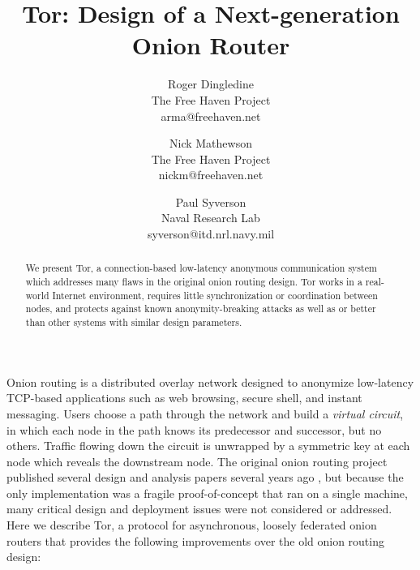 \documentclass[times,10pt,twocolumn]{article}
\begin{document}

\title{Tor: Design of a Next-generation Onion Router}

\author{Roger Dingledine \\ The Free Haven Project \\ arma@freehaven.net \and
Nick Mathewson \\ The Free Haven Project \\ nickm@freehaven.net \and
Paul Syverson \\ Naval Research Lab \\ syverson@itd.nrl.navy.mil}

\maketitle
\thispagestyle{empty}

\begin{abstract}
We present Tor, a connection-based low-latency anonymous communication
system which addresses many flaws in the original onion routing design.
Tor works in a real-world Internet environment,
requires little synchronization or coordination between nodes, and
protects against known anonymity-breaking attacks as well
as or better than other systems with similar design parameters.
\end{abstract}



\label{sec:intro}

Onion routing is a distributed overlay network designed to anonymize
low-latency TCP-based applications such as web browsing, secure
shell, and instant messaging. Users choose a path through the
network and build a \emph{virtual circuit}, in which each node in
the path knows its predecessor and successor, but no others. Traffic
flowing down the circuit is unwrapped by a symmetric key at each
node which reveals the downstream node. The original onion routing
project published several design and analysis papers several years
ago \cite{or-journal,or-discex,or-ih,or-pet}, but because the only
implementation was a fragile proof-of-concept that ran on a single
machine, many critical design and deployment issues were not considered
or addressed. Here we describe Tor, a protocol for asynchronous, loosely
federated onion routers that provides the following improvements over
the old onion routing design:
\end{document}

